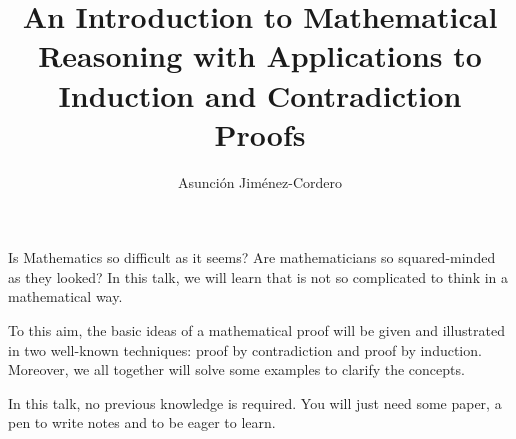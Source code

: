 \documentclass[a4paper,12pt]{article}
\begin{document}
\title{\bf An Introduction to Mathematical Reasoning with Applications to Induction and Contradiction Proofs}
\author{\Large Asunci\'on Jim\'enez-Cordero} 
    \date{}
  \maketitle
Is Mathematics so difficult as it seems? Are mathematicians so squared-minded as they looked? In this talk, we will learn that is not so complicated to think in a mathematical way.

To this aim, the basic ideas of a mathematical proof will be given and illustrated in two well-known techniques: proof by contradiction and proof by induction. Moreover, we all together will solve some examples to clarify the concepts.

In this talk, no previous knowledge is required. You will just need some paper, a pen to write notes and to be eager to learn.
\end{document}
